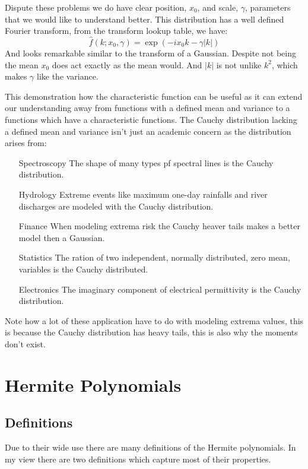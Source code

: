 \documentclass[12pt]{report}
\begin{document}
Dispute these problems we do have clear position, $x_0$, and scale, $\gamma$, parameters that we would like to understand better.
This distribution has a well defined Fourier transform, from the transform lookup table, we have:
\[\hat{f}(k;x_0,\gamma) = \exp(-ix_0k-\gamma|k|)\]
And looks remarkable similar to the transform of a Gaussian.
Despite not being the mean $x_0$ does act exactly as the mean would.
And $|k|$ is not unlike $k^2$, which makes $\gamma$ like the variance.

This demonstration how the characteristic function can be useful as it can extend our understanding away from functions with a defined mean and variance to a functions which have a characteristic functions.
The Cauchy distribution lacking a defined mean and variance isn't just an academic concern as the distribution arises from:
\begin{enumerate}
\item[Spectroscopy] The shape of many types pf spectral lines is the Cauchy distribution.
\item[Hydrology] Extreme events like maximum one-day rainfalls and river discharges are modeled with the Cauchy distribution.
\item[Finance] When modeling extrema risk the Cauchy heaver tails makes a better model then a Gaussian.
\item[Statistics] The ration of two independent, normally distributed, zero mean, variables is the Cauchy distributed.
\item[Electronics] The imaginary component of electrical permittivity is the Cauchy distribution.
\end{enumerate}

Note how a lot of these application have to do with modeling extrema values, this is because the Cauchy distribution has heavy tails, this is also why the moments don't exist.

\section{Hermite Polynomials}
\subsection{Definitions}
Due to their wide use there are many definitions of the Hermite polynomials.
In my view there are two definitions which capture most of their properties.
\end{document}

